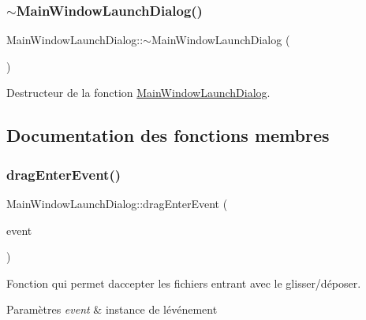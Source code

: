 \subsubsection{\texorpdfstring{$\sim$\+Main\+Window\+Launch\+Dialog()}{~MainWindowLaunchDialog()}}
{\footnotesize\ttfamily Main\+Window\+Launch\+Dialog\+::$\sim$\+Main\+Window\+Launch\+Dialog (\begin{DoxyParamCaption}{ }\end{DoxyParamCaption})}



Destructeur de la fonction \hyperlink{classMainWindowLaunchDialog}{Main\+Window\+Launch\+Dialog}. 



\subsection{Documentation des fonctions membres}
\mbox{\label{classMainWindowLaunchDialog_aaf393173ffd6c63b2c4d5bdd48b8ddb4}} 
\subsubsection{\texorpdfstring{drag\+Enter\+Event()}{dragEnterEvent()}}
{\footnotesize\ttfamily Main\+Window\+Launch\+Dialog\+::drag\+Enter\+Event (\begin{DoxyParamCaption}\item[{Q\+Drag\+Enter\+Event $\ast$}]{event }\end{DoxyParamCaption})\hspace{0.3cm}{\ttfamily [private]}}



Fonction qui permet d\textquotesingle{}accepter les fichiers entrant avec le glisser/déposer. 


\begin{DoxyParams}{Paramètres}
{\em event} & instance de l\textquotesingle{}événement \\
\hline
\end{DoxyParams}
\mbox{\label{classMainWindowLaunchDialog_a6b292183d418fe79b79225d9a35bd3dd}} 
